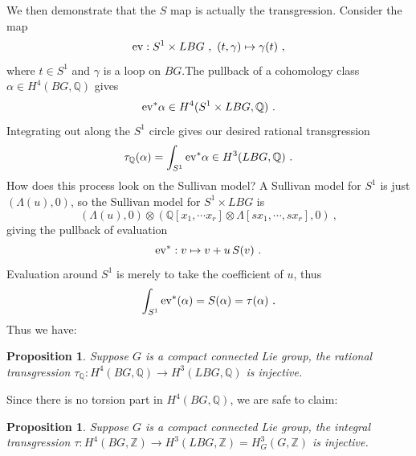 \documentclass[a4paper,11pt]{article}
\newtheorem{prop}[lemma]{Proposition}
\newcommand{\be}{\begin{equation}}
\newcommand{\ee}{\end{equation}}
\def\bbQ{\mathbb{Q}}
\def\bbZ{\mathbb{Z}}
\begin{document}
We then demonstrate that the $S$ map is actually the transgression. Consider the map
\be  {\rm ev}: S^1\times LBG \ , \ (t,\gamma) \mapsto \gamma(t) \ ,  \ee
where $t\in S^1$ and $\gamma$ is a loop on $BG$.The pullback of a cohomology class $\alpha\in H^4(BG,\bbQ)$ gives
\be {\rm ev}^* \alpha \in H^4(S^1\times LBG,\bbQ) \ . \ee
Integrating out along the $S^1$ circle gives our desired rational transgression~\cite{waldorf2016transgression}
\be \tau_\bbQ(\alpha) = \int_{S^1} {\rm ev}^*\alpha \in H^3(LBG,\bbQ) \ . \ee
How does this process look on the Sullivan model? A Sullivan model for $S^1$ is just $(\Lambda (u),0)$, so the Sullivan model for $S^1\times LBG$ is \be (\Lambda(u),0)\otimes (\bbQ[x_1,\cdots x_r]\otimes  \Lambda [sx_1,\cdots,sx_r],0)\ , \ee
giving the pullback of evaluation
\be {\rm ev}^* : v \mapsto  v+ u \, S(v) \ .\ee
Evaluation around $S^1$ is merely to take the coefficient of $u$, thus
\be \int_{S^1} {\rm ev}^* (\alpha) = S(\alpha) = \tau(\alpha) \ .  \ee
Thus we have:
\begin{prop}
    Suppose $G$ is a compact connected Lie group, the rational transgression $\tau_\bbQ:H^4(BG,\bbQ) \to H^3(LBG,\bbQ)$ is injective.
\end{prop}
Since there is no torsion part in $H^4(BG,\bbQ)$, we are safe to claim:
\begin{prop}
    Suppose $G$ is a compact connected Lie group, the integral transgression $\tau:H^4(BG,\bbZ) \to H^3(LBG,\bbZ) = H^3_G(G,\bbZ)$ is injective.
\end{prop}





\end{document}
